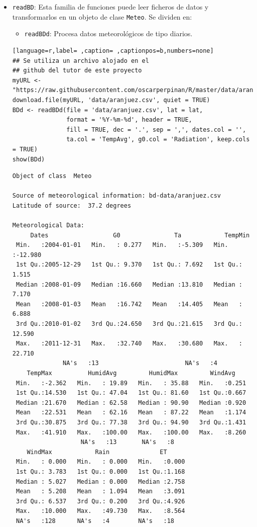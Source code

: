\begin{itemize}
\item \texttt{readBD}: Esta familia de funciones puede leer ficheros de datos y transformarlos en un objeto de clase \texttt{Meteo}. Se dividen en:
\begin{itemize}
\item \texttt{readBDd}: Procesa datos meteorológicos de tipo diarios.
\end{itemize}
\begin{lstlisting}[language=r,label= ,caption= ,captionpos=b,numbers=none]
## Se utiliza un archivo alojado en el
## github del tutor de este proyecto 
myURL <-"https://raw.githubusercontent.com/oscarperpinan/R/master/data/aranjuez.csv"
download.file(myURL, 'data/aranjuez.csv', quiet = TRUE)
BDd <- readBDd(file = 'data/aranjuez.csv', lat = lat,
               format = '%Y-%m-%d', header = TRUE,
               fill = TRUE, dec = '.', sep = ',', dates.col = '',
               ta.col = 'TempAvg', g0.col = 'Radiation', keep.cols = TRUE)
show(BDd)
\end{lstlisting}

\begin{verbatim}
Object of class  Meteo 

Source of meteorological information: bd-data/aranjuez.csv 
Latitude of source:  37.2 degrees

Meteorological Data:
     Dates                  G0               Ta            TempMin       
 Min.   :2004-01-01   Min.   : 0.277   Min.   :-5.309   Min.   :-12.980  
 1st Qu.:2005-12-29   1st Qu.: 9.370   1st Qu.: 7.692   1st Qu.:  1.515  
 Median :2008-01-09   Median :16.660   Median :13.810   Median :  7.170  
 Mean   :2008-01-03   Mean   :16.742   Mean   :14.405   Mean   :  6.888  
 3rd Qu.:2010-01-02   3rd Qu.:24.650   3rd Qu.:21.615   3rd Qu.: 12.590  
 Max.   :2011-12-31   Max.   :32.740   Max.   :30.680   Max.   : 22.710  
		      NA's   :13                        NA's   :4        
    TempMax          HumidAvg         HumidMax         WindAvg     
 Min.   :-2.362   Min.   : 19.89   Min.   : 35.88   Min.   :0.251  
 1st Qu.:14.530   1st Qu.: 47.04   1st Qu.: 81.60   1st Qu.:0.667  
 Median :21.670   Median : 62.58   Median : 90.90   Median :0.920  
 Mean   :22.531   Mean   : 62.16   Mean   : 87.22   Mean   :1.174  
 3rd Qu.:30.875   3rd Qu.: 77.38   3rd Qu.: 94.90   3rd Qu.:1.431  
 Max.   :41.910   Max.   :100.00   Max.   :100.00   Max.   :8.260  
				   NA's   :13       NA's   :8      
    WindMax            Rain              ET       
 Min.   : 0.000   Min.   : 0.000   Min.   :0.000  
 1st Qu.: 3.783   1st Qu.: 0.000   1st Qu.:1.168  
 Median : 5.027   Median : 0.000   Median :2.758  
 Mean   : 5.208   Mean   : 1.094   Mean   :3.091  
 3rd Qu.: 6.537   3rd Qu.: 0.200   3rd Qu.:4.926  
 Max.   :10.000   Max.   :49.730   Max.   :8.564  
 NA's   :128      NA's   :4        NA's   :18
\end{verbatim}


\end{itemize}
